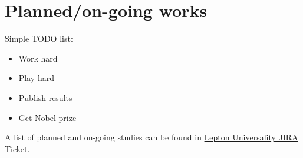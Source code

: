 \section{Planned/on-going works}
{ \small Simple TODO list: 
\begin{itemize}
\item Work hard
\item Play hard 
\item Publish results
\item Get Nobel prize
\end{itemize}
}


A list of planned and on-going studies can be found in \href{https://its.cern.ch/jira/projects/ATLASSMWBR/issues/ATLASSMWBR-1}{Lepton Universality JIRA Ticket}.
